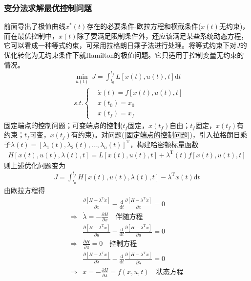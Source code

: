         \subsubsection{变分法求解最优控制问题}
            \par
            前面导出了极值曲线$x^*(t)$存在的必要条件-欧拉方程和横截条件($x(t)$无约束)，而在最优控制中，$x(t)$除了要满足限制条件外，还应该满足某些系统动态方程，它可以看成一种等式约束，可采用拉格朗日乘子法进行处理。将等式约束下对$J$的优化转化为无约束条件下就Hamilton的极值问题。它只适用于控制变量无约束的情况。
            \begin{align*}
            & \min_{u(t)} \ J = \int_{t_0}^{t_f}L[x(t),u(t),t]\mathrm{d}t\\
            & s.t.\left\{
            \begin{aligned}
            & \dot{x}(t) = f[x(t),u(t),t]\\
            & x(t_0) = x_0\\
            & x(t_f) = x_f
            \end{aligned}
            \right.
            \end{align*}
            固定端点的控制问题\label{固定端点的控制问题}；可变端点的控制\label{可变端点的控制}($t_f$固定，$x(t_f)$自由；$t_f$固定，$x(t_f)$有约束；$t_f$可变，$x(t_f)$有约束)。对问题(\ref{固定端点的控制问题})，引入拉格朗日乘子$\lambda(t) = [\lambda_1(t),\lambda_2(t),\dots,\lambda_n(t)]^\mathrm{T}$，构建哈密顿标量函数
            \begin{align*}
            H[x(t),u(t),\lambda(t),t]= L[x(t),u(t),t]+\lambda^\mathrm{T}(t)f[x(t),u(t),t]
            \end{align*}
            则上述优化问题变为
            \begin{align*}
            J = \int_{t_0}^{t_f}  H[x(t),u(t),\lambda(t),t] - \lambda^\mathrm{T}x(t)\mathrm{d}t
            \end{align*}
            由欧拉方程得
            \begin{align*}
            & \frac{\partial [H-\lambda^\mathrm{T}\dot{x}]}{\partial x}-\frac{\mathrm{d}}{\mathrm{d}t}\frac{\partial [H - \lambda^\mathrm{T}\dot{x}]}{\partial \dot{x}} = 0\\
            \Rightarrow{} & \dot{\lambda} = -\frac{\partial H}{\partial x} \quad \text{伴随方程}\\
            & \frac{\partial [H-\lambda^\mathrm{T}\dot{x}]}{\partial u}-\frac{\mathrm{d}}{\mathrm{d}t}\frac{\partial [H - \lambda^\mathrm{T}\dot{x}]}{\partial \dot{u}} = 0\\
            \Rightarrow{} &\frac{\partial H}{\partial u} = 0 \quad \text{控制方程}\\
            & \frac{\partial [H-\lambda^\mathrm{T}\dot{x}]}{\partial \lambda}-\frac{\mathrm{d}}{\mathrm{d}t}\frac{\partial [H - \lambda^\mathrm{T}\dot{x}]}{\partial \dot{\lambda}} = 0\\
            \Rightarrow{} & \dot{x} = -\frac{\partial H}{\partial \lambda} = f(x,u,t) \quad \text{状态方程}\\
            \end{align*}
